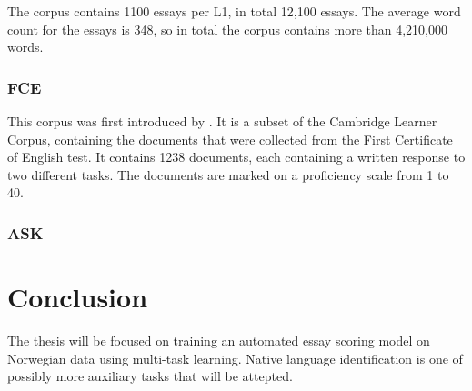 The corpus contains 1100 essays per L1, in total 12,100 essays. The average
word count for the essays is 348, so in total the corpus contains more than
4,210,000 words.


\subsubsection{FCE}

This corpus was first introduced by \textcite{yannakoudakis2011new}. It is a
subset of the Cambridge Learner Corpus, containing the documents that were
collected from the First Certificate of English test. It contains 1238
documents, each containing a written response to two different tasks. The
documents are marked on a proficiency scale from 1 to 40.


\subsubsection{ASK}


\section{Conclusion}

The thesis will be focused on training an automated essay scoring model on
Norwegian data using multi-task learning. Native language identification is
one of possibly more auxiliary tasks that will be attepted.
